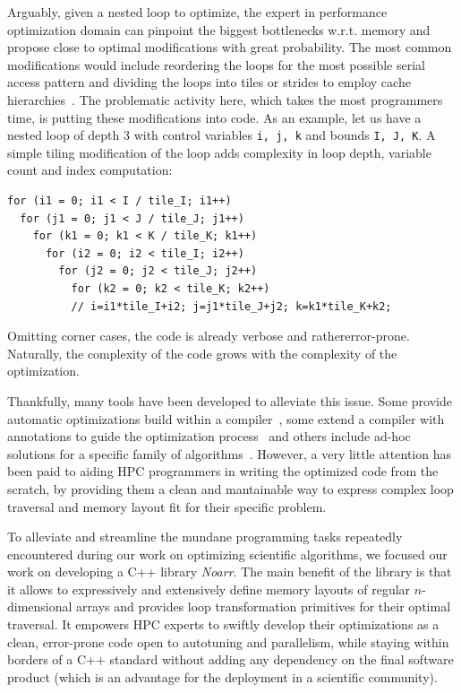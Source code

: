 Arguably, given a nested loop to optimize, the expert in performance optimization domain can pinpoint the biggest bottlenecks w.r.t. memory and propose close to optimal modifications with great probability. The most common modifications would include reordering the loops for the most possible serial access pattern and dividing the loops into tiles or strides to employ cache hierarchies~\cite{wolf1991data}. The problematic activity here, which takes the most programmers time, is putting these modifications into code. As an example, let us have a nested loop of depth 3 with control variables \texttt{i, j, k} and bounds \texttt{I, J, K}. A simple tiling modification of the loop adds complexity in loop depth, variable count and index computation: 
\begin{verbatim}
for (i1 = 0; i1 < I / tile_I; i1++)
  for (j1 = 0; j1 < J / tile_J; j1++)
    for (k1 = 0; k1 < K / tile_K; k1++)
      for (i2 = 0; i2 < tile_I; i2++)
        for (j2 = 0; j2 < tile_J; j2++)
          for (k2 = 0; k2 < tile_K; k2++)
          // i=i1*tile_I+i2; j=j1*tile_J+j2; k=k1*tile_K+k2;
\end{verbatim}
Omitting corner cases, the code is already verbose and rathererror-prone. Naturally, the complexity of the code grows with the complexity of the optimization.

Thankfully, many tools have been developed to alleviate this issue. Some provide automatic optimizations build within a compiler~\cite{trifunovic2010graphite,grosser2012polly}, some extend a compiler with annotations to guide the optimization process~\cite{donadio2005language,yi2007poet,chen2008chill,namjoshi2016loopy} and others include ad-hoc solutions for a specific family of algorithms~\cite{9485033,AFANASYEV2021100707}. However, a very little attention has been paid to aiding HPC programmers in writing the optimized code from the scratch, by providing them a clean and mantainable way to express complex loop traversal and memory layout fit for their specific problem.

To alleviate and streamline the mundane programming tasks repeatedly encountered during our work on optimizing scientific algorithms, we focused our work on developing a C++ library \emph{Noarr}. The main benefit of the library is that it allows to expressively and extensively define memory layouts of regular $n$-dimensional arrays and provides loop transformation primitives for their optimal traversal. It empowers HPC experts to swiftly develop their optimizations as a clean, error-prone code open to autotuning and parallelism, while staying within borders of a C++ standard without adding any dependency on the final software product (which is an advantage for the deployment in a scientific community).

